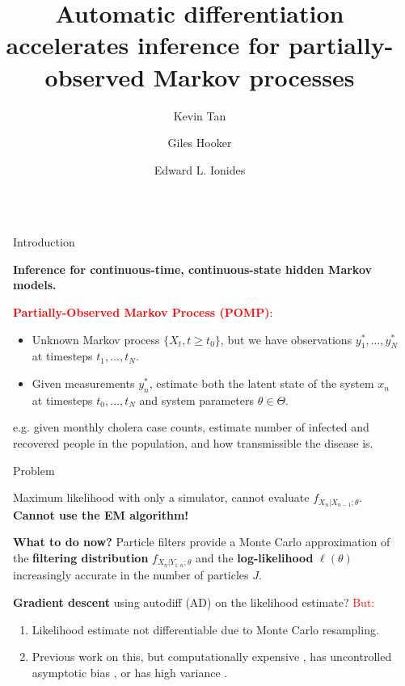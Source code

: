 \documentclass[final]{beamer}
\title{Automatic differentiation accelerates inference
for partially-observed Markov processes}
\author{Kevin Tan \inst{*} \and Giles Hooker \inst{*} \and Edward L. Ionides \inst{\cross[.4pt]$\cdot$}}
\institute[shortinst]{\inst{*} Department of Statistics and Data Science, University of Pennsylvania \quad  \inst{\cross[.4pt]} Department of Statistics, University of Michigan}
\newlength{\sepwidth}
\newlength{\colwidth}
\newcommand{\separatorcolumn}{\begin{column}{\sepwidth}\end{column}}
\begin{document}
\begin{frame}[t]
\begin{columns}[t]
\separatorcolumn

\begin{column}{\colwidth}

  \begin{block}{Introduction}
  
\textbf{Inference for continuous-time, continuous-state hidden Markov models.}

\begin{tcolorbox}[enhanced,colback=white!100!white,colframe=red!100!red]
\textbf{\textcolor{red}{Partially-Observed Markov Process (POMP)}}: 
\begin{itemize}
    \item Unknown Markov process $\{X_t, t \geq t_0\}$, but we have observations $y_1^*,...,y_N^*$ at timesteps $t_1,..., t_N$.  
    \item Given measurements $y_n^*$, estimate both the latent state of the system $x_n$ at timesteps $t_0,...,t_N$ and system parameters $\theta \in \Theta$. 
\end{itemize}
\end{tcolorbox}
e.g. given monthly cholera case counts, estimate number of infected and recovered people in the population, and how transmissible the disease is. 

  \end{block}

  \vspace{-1ex}
  \begin{block}{Problem}
  \vspace{-1.6ex}
  \begin{tcolorbox}[enhanced,colback=white!100!white,colframe=red!100!red]
  \begin{center}
  Maximum likelihood with only a simulator, cannot evaluate $f_{X_n|X_{n-1};\theta}$. \textbf{Cannot use the EM algorithm!}
  \end{center}
\end{tcolorbox}

  \textbf{What to do now?} Particle filters provide a Monte Carlo approximation of the \textbf{filtering distribution} $f_{X_n|Y_{1:n};\theta}$ and the \textbf{log-likelihood} $\ell(\theta)$ increasingly accurate in the number of particles $J$. 
  
  \textbf{Gradient descent} using autodiff (AD) on the likelihood estimate? \textcolor{red}{But:}
  \begin{enumerate}
      \item Likelihood estimate not differentiable due to Monte Carlo resampling.
      \item Previous work \cite{corenflos21, naesseth18, scibior21} on this, but computationally expensive \cite{corenflos21}, has uncontrolled asymptotic bias \cite{naesseth18}, or has high variance \cite{poyiadjis11}. 
  \end{enumerate}
  \end{block}
  

\end{column}
\end{columns}
\end{frame}
\end{document}
